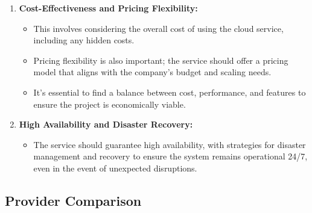 \documentclass{article}
\begin{document}
\begin{enumerate}
    \item \textbf{Cost-Effectiveness and Pricing Flexibility:}
    \begin{itemize}
        \item This involves considering the overall cost of using the cloud service, including any hidden costs. 
        \item Pricing flexibility is also important; the service should offer a pricing model that aligns with the company’s budget and scaling needs.
        \item It's essential to find a balance between cost, performance, and features to ensure the project is economically viable.
    \end{itemize} 

    \item \textbf{High Availability and Disaster Recovery:}
    \begin{itemize}
        \item The service should guarantee high availability, with strategies for disaster management and recovery to ensure the system remains operational 24/7, even in the event of unexpected disruptions.
    \end{itemize}


\end{enumerate}
\subsection{Provider Comparison}
\end{document}
